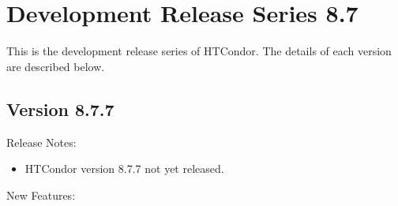 
\section{\label{sec:History-8-7}Development Release Series 8.7}

This is the development release series of HTCondor.
The details of each version are described below.

\subsection*{\label{sec:New-8-7-7}Version 8.7.7}

\noindent Release Notes:

\begin{itemize}

\item HTCondor version 8.7.7 not yet released.

\end{itemize}


\noindent New Features:

